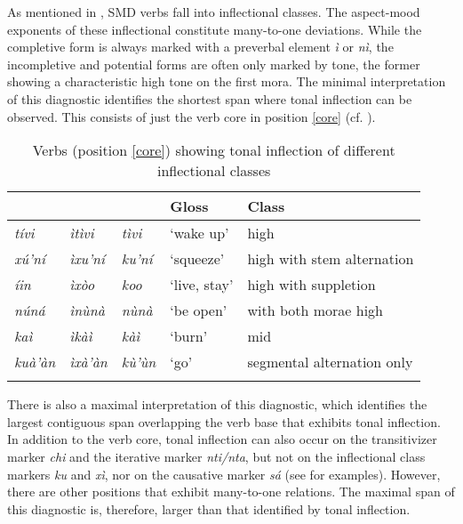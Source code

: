 \documentclass[output=paper]{langscibook}
\begin{document}
As mentioned in , SMD verbs fall into inflectional classes. The aspect-mood exponents of these inflectional constitute many-to-one deviations.
While the completive form is always marked with a preverbal element \emph{ì} or \textit{nì}, the incompletive and potential forms are often only marked by tone, the former showing a characteristic high tone on the first mora. 
The minimal interpretation of this diagnostic identifies the shortest span where tonal inflection can be observed. This consists of just the verb core in position \ref{core} (cf. ).

\begin{table}
	\caption{Verbs (position \ref{core}) showing tonal inflection of different inflectional classes}
	\label{tab:tonalinfl}
	\begin{tabularx}{\textwidth}{Xllll} \lsptoprule
		\Incmpl{}                & \Cmpl{}              & \Pot{}               & Gloss & Class \\ \midrule
		\textit{tívi} 		& \textit{ìtìvi} 	& \textit{tìvi}	& `wake up'  		& \Incmpl{} high \\
		\textit{xú'ní}      & \textit{ìxu'ní} 	& \textit{ku'ní} 	& `squeeze' 	& \Incmpl{} high with stem alternation \\ 
		\textit{íin}	 	& \textit{ìxòo} 	& \textit{koo}	 	& `live, stay' 	& \Incmpl{} high with suppletion \\
		\textit{núná} 		& \textit{ìnùnà} 	& \textit{nùnà} 	& `be open' 	& \Incmpl{} with both morae high \\
		\textit{kaì}  		& \textit{ìkàì}  	& \textit{kàì}  	& `burn'    	& \Incmpl{} mid \\
		\textit{kuà'àn}	 	& \textit{ìxà'àn}	& \textit{kù'ùn} 	& `go' 			& segmental alternation only \\
		\lspbottomrule
	\end{tabularx}
\end{table}

There is also a maximal interpretation of this diagnostic, which identifies the largest contiguous span overlapping the verb base that exhibits tonal inflection.
In addition to the verb core, tonal inflection can also occur on the transitivizer marker \emph{chi} and the iterative marker \emph{nti/nta}, but not on the inflectional class markers \textit{ku} and \textit{xì}, nor on the causative marker \textit{sá} (see  for examples).
However, there are other positions that exhibit many-to-one relations. The maximal span of this diagnostic is, therefore, larger than that identified by tonal inflection.
\end{document}
